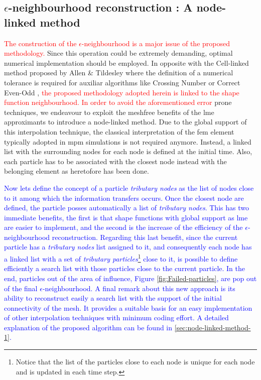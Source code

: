 \documentclass[preprint,12pt,a4paper]{elsarticle}
\newcommand{\PNA}[1]{
  \textcolor{red}{{#1}}
}
\newcommand{\MMP}[1]{
  \textcolor{blue}{{#1}}
}
\begin{document}
\subsection{$\epsilon$-neighbourhood reconstruction : A node-linked method}
\label{sec:epsil-neighb-reconst}
\PNA{The construction of the $\epsilon$-neighbourhood is a major issue of the proposed methodology.} Since this operation could be extremely demanding, optimal
numerical implementation should be employed. In opposite with the Cell-linked
method proposed by Allen \& Tildesley \cite{Allen_et_al_1989} where
the definition of a numerical tolerance is required for auxiliar
algorithms like Crossing Number \cite{Shimrat_1962} or Correct
Even-Odd \cite{Galetzka_et_al_2017}, \PNA{the proposed methodology adopted herein is linked to the shape function neighbourhood. In order to avoid the aforementioned error} prone
techniques, we endeavour to exploit the meshfree benefits of
the \acrshort{lme} approximants to introduce a node-linked method. Due
to the global support of this interpolation technique, the classical
interpretation of the \acrshort{fem} element typically adopted in
\acrshort{mpm} simulations is not required anymore. Instead, a linked
list with the surrounding nodes for each node is defined at the initial
time. Also, each particle has to be associated with the
closest node instead with the belonging element as heretofore has been
done.
\MMP{Now lets define the concept of a particle \textit{tributary nodes} as the
list of nodes close to it among which the information transfers
occurs. Once the closest node are defined, the particle
posses automatically a list of \textit{tributary nodes}. This has two
immediate benefits, the first is that shape functions with global
support as \acrshort{lme} are easier to implement,
and the second is the increase of the efficiency of the $\epsilon$-neighbourhood
reconstruction. Regarding this last benefit, since the current
particle has a \textit{tributary nodes} list assigned to it, and
consequently each node has a linked list with a set of
\textit{tributary particles}\footnote{Notice that the list of the
  particles close to each node is unique for each node and is updated
  in each time step.} close to it, is possible to define efficiently a
search list with those particles close to the current particle.
In the end, particles out of the area of influence, Figure
\ref{fig:Failed-particles}, are pop out of the final
$\epsilon$-neighbourhood. A final remark about this new approach is
its ability to reconstruct easily a search list with the support of
the initial connectivity of the mesh. It provides a suitable basis for
an easy implementation of other interpolation techniques with minimum
coding effort. A detailed explanation of the proposed algorithm can be
found in \ref{sec:node-linked-method-1}.}
\end{document}
